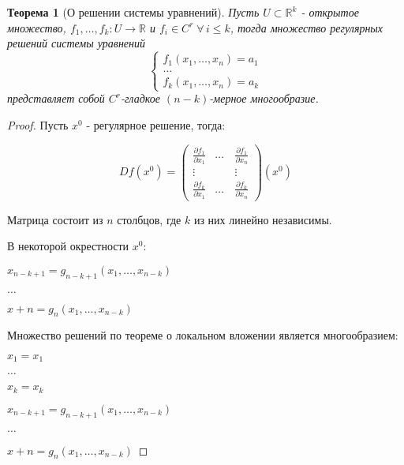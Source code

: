 \documentclass[a5paper]{article}
\newcounter{through}
\theoremstyle{plain}
\newtheorem{theorem}[through]{Теорема}
\theoremstyle{definition}
\numberwithin{through}{section}
\numberwithin{equation}{section}
\begin{document}
\begin{theorem}[О решении системы уравнений]
	Пусть $U \subset \mathbb{R}^k$ - открытое множество, $f_1, \ldots, f_k : 
	U \to \mathbb{R}$ и $f_i \in C^r \; \forall \, i \leq k$, тогда множество регулярных решений системы уравнений
	\begin{equation*}
	\begin{cases}
	f_1(x_1, \ldots, x_n) = a_1
	\\
	\ldots
	\\
	f_k(x_1, \ldots, x_n) = a_k
	\end{cases}
	\end{equation*}
	представляет собой $C^r$-гладкое $(n-k)$-мерное многообразие.
\end{theorem}
\begin{proof}	
	Пусть $x^0$ - регулярное решение, тогда:
	
	\begin{equation*}
	D f(x^0) = \begin{pmatrix}
	\frac{\partial f_1}{ \partial x_1}& \ldots& \frac{\partial f_1}{ \partial x_n} \\
	\vdots& \quad& \vdots \\
	\frac{\partial f_k}{ \partial x_1}& \ldots& \frac{\partial f_k}{ \partial x_n}
	\end{pmatrix} (x^0)
	\end{equation*}
	
	Матрица состоит из $n$ столбцов, где $k$ из них линейно независимы.
	
	
	
	В некоторой окрестности $x^0$:	
	
	$x_{n-k+1} = g_{n-k+1}(x_1, \ldots, x_{n-k})$
	
	$\ldots$
	
	$x+n = g_n(x_1, \ldots, x_{n-k})$
	
	Множество решений по теореме о локальном вложении является многообразием:
	
	$x_1=x_1$
	
	$\ldots$
	
	$x_k=x_k$
	
	$x_{n-k+1} = g_{n-k+1}(x_1, \ldots, x_{n-k})$
	
	$\ldots$
	
	$x+n = g_n(x_1, \ldots, x_{n-k})$
	
\end{proof}
\end{document}
